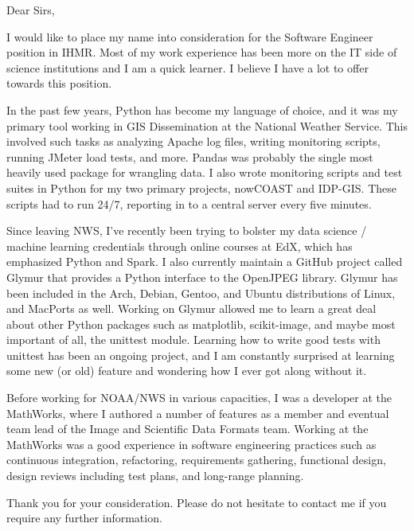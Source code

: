 Dear Sirs,

I would like to place my name into consideration for the Software Engineer position in IHMR.  Most of my work experience has been more on the IT side of science institutions and I am a quick learner.  I believe I have a lot to offer towards this position.

In the past few years, Python has become my language of choice, and it was my primary tool working in GIS Dissemination at the National Weather Service.  This involved such tasks as analyzing Apache log files, writing monitoring scripts, running JMeter load tests, and more.  Pandas was probably the single most heavily used package for wrangling data.  I also wrote monitoring scripts and test suites in Python for my two primary projects, nowCOAST and IDP-GIS.  These scripts had to run 24/7, reporting in to a central server every five minutes.

Since leaving NWS, I've recently been trying to bolster my data science / machine learning credentials through online courses at EdX, which has emphasized Python and Spark.  I also currently maintain a GitHub project called Glymur that provides a Python interface to the OpenJPEG library.  Glymur has been included in the Arch, Debian, Gentoo, and Ubuntu distributions of Linux, and MacPorts as well.  Working on Glymur allowed me to learn a great deal about other Python packages such as matplotlib, scikit-image, and maybe most important of all, the unittest module.  Learning how to write good tests with unittest has been an ongoing project, and I am constantly surprised at learning some new (or old) feature and wondering how I ever got along without it.

Before working for NOAA/NWS in various capacities, I was a developer at the MathWorks, where I authored a number of features as a member and eventual team lead of the Image and Scientific Data Formats team.  Working at the MathWorks was a good experience in software engineering practices such as continuous integration, refactoring, requirements gathering, functional design, design reviews including test plans, and long-range planning.

Thank you for your consideration.  Please do not hesitate to contact me if you require any further information.
